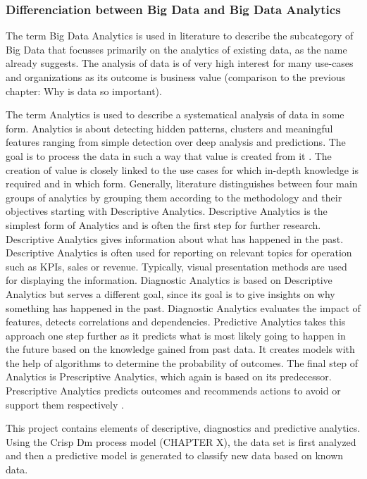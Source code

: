 \subsubsection{Differenciation between Big Data and Big Data Analytics}

The term Big Data Analytics is used in literature to describe the subcategory of Big Data that 
focusses primarily on the analytics of existing data, as the name already suggests. The analysis 
of data is of very high interest for many use-cases and organizations as its outcome is business 
value (comparison to the previous chapter: Why is data so important).

The term Analytics is used to describe a systematical analysis of data in some form. Analytics is 
about detecting hidden patterns, clusters and meaningful features ranging from simple detection 
over deep analysis and predictions. The goal is to process the data in such a way that value is 
created from it \cite[p.2]{Tanwar2015} \cite[p.8f]{Meier_2021}. The creation of value is closely linked to 
the use cases for which in-depth knowledge is required and in which form. Generally, literature 
distinguishes between four main groups of analytics by grouping them according to the methodology 
and their objectives starting with Descriptive Analytics. Descriptive Analytics is the simplest 
form of Analytics and is often the first step for further research. Descriptive Analytics gives 
information about what has happened in the past. Descriptive Analytics is often used for reporting 
on relevant topics for operation such as KPIs, sales or revenue. Typically, visual presentation 
methods are used for displaying the information. Diagnostic Analytics is based on Descriptive 
Analytics but serves a different goal, since its goal is to give insights on why something has 
happened in the past. Diagnostic Analytics evaluates the impact of features, detects correlations 
and dependencies. Predictive Analytics takes this approach one step further as it predicts what 
is most likely going to happen in the future based on the knowledge gained from past data. It 
creates models with the help of algorithms to determine the probability of outcomes. The final 
step of Analytics is Prescriptive Analytics, which again is based on its predecessor. Prescriptive 
Analytics predicts outcomes and recommends actions to avoid or support them respectively \cite[p.8f]{Meier_2021}.

This project contains elements of descriptive, diagnostics and predictive analytics. Using the 
Crisp Dm process model (CHAPTER X), the data set is first analyzed and then a predictive model 
is generated to classify new data based on known data.

